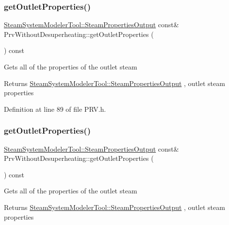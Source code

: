 \subsubsection{\texorpdfstring{get\+Outlet\+Properties()}{getOutletProperties()}\hspace{0.1cm}{\footnotesize\ttfamily [1/3]}}
{\footnotesize\ttfamily \hyperlink{struct_steam_system_modeler_tool_1_1_steam_properties_output}{Steam\+System\+Modeler\+Tool\+::\+Steam\+Properties\+Output} const\& Prv\+Without\+Desuperheating\+::get\+Outlet\+Properties (\begin{DoxyParamCaption}{ }\end{DoxyParamCaption}) const\hspace{0.3cm}{\ttfamily [inline]}}

Gets all of the properties of the outlet steam \begin{DoxyReturn}{Returns}
\hyperlink{struct_steam_system_modeler_tool_1_1_steam_properties_output}{Steam\+System\+Modeler\+Tool\+::\+Steam\+Properties\+Output} , outlet steam properties 
\end{DoxyReturn}


Definition at line 89 of file P\+R\+V.\+h.

\mbox{\label{class_prv_without_desuperheating_afcf1f5d7e6b18643ac8adc9023578147}} 
\subsubsection{\texorpdfstring{get\+Outlet\+Properties()}{getOutletProperties()}\hspace{0.1cm}{\footnotesize\ttfamily [2/3]}}
{\footnotesize\ttfamily \hyperlink{struct_steam_system_modeler_tool_1_1_steam_properties_output}{Steam\+System\+Modeler\+Tool\+::\+Steam\+Properties\+Output} const\& Prv\+Without\+Desuperheating\+::get\+Outlet\+Properties (\begin{DoxyParamCaption}{ }\end{DoxyParamCaption}) const\hspace{0.3cm}{\ttfamily [inline]}}

Gets all of the properties of the outlet steam \begin{DoxyReturn}{Returns}
\hyperlink{struct_steam_system_modeler_tool_1_1_steam_properties_output}{Steam\+System\+Modeler\+Tool\+::\+Steam\+Properties\+Output} , outlet steam properties 
\end{DoxyReturn}


